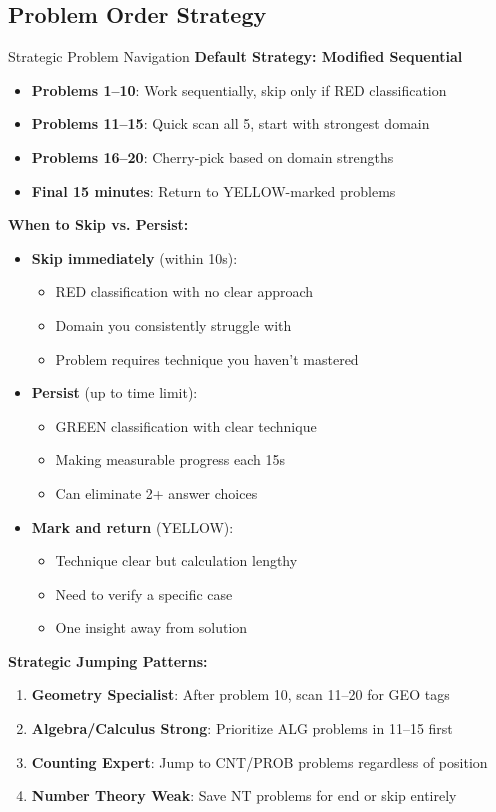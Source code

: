 \documentclass{article}
\begin{document}
\subsection{Problem Order Strategy}

\begin{timebox}{Strategic Problem Navigation}
\textbf{Default Strategy: Modified Sequential}
\begin{itemize}[nosep]
\item \textbf{Problems 1--10}: Work sequentially, skip only if RED classification
\item \textbf{Problems 11--15}: Quick scan all 5, start with strongest domain
\item \textbf{Problems 16--20}: Cherry-pick based on domain strengths
\item \textbf{Final 15 minutes}: Return to YELLOW-marked problems
\end{itemize}

\textbf{When to Skip vs. Persist:}
\begin{itemize}[nosep]
\item \textbf{Skip immediately} (within 10s):
  \begin{itemize}[nosep]
  \item RED classification with no clear approach
  \item Domain you consistently struggle with
  \item Problem requires technique you haven't mastered
  \end{itemize}
\item \textbf{Persist} (up to time limit):
  \begin{itemize}[nosep]
  \item GREEN classification with clear technique
  \item Making measurable progress each 15s
  \item Can eliminate 2+ answer choices
  \end{itemize}
\item \textbf{Mark and return} (YELLOW):
  \begin{itemize}[nosep]
  \item Technique clear but calculation lengthy
  \item Need to verify a specific case
  \item One insight away from solution
  \end{itemize}
\end{itemize}

\textbf{Strategic Jumping Patterns:}
\begin{enumerate}[nosep]
\item \textbf{Geometry Specialist}: After problem 10, scan 11--20 for GEO tags
\item \textbf{Algebra/Calculus Strong}: Prioritize ALG problems in 11--15 first
\item \textbf{Counting Expert}: Jump to CNT/PROB problems regardless of position
\item \textbf{Number Theory Weak}: Save NT problems for end or skip entirely
\end{enumerate}


\end{timebox}
\end{document}
